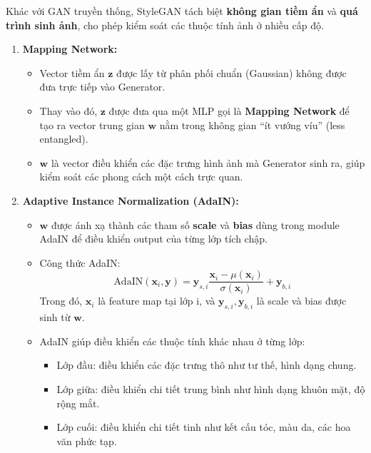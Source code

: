 Khác với GAN truyền thống, StyleGAN tách biệt \textbf{không gian tiềm ẩn} và \textbf{quá trình sinh ảnh}, cho phép kiểm soát các thuộc tính ảnh ở nhiều cấp độ.

\begin{enumerate}
	\item \textbf{Mapping Network:} 
	\begin{itemize}
		\item Vector tiềm ẩn $\mathbf{z}$ được lấy từ phân phối chuẩn (Gaussian) không được đưa trực tiếp vào Generator.
		\item Thay vào đó, $\mathbf{z}$ được đưa qua một MLP gọi là \textbf{Mapping Network} để tạo ra vector trung gian $\mathbf{w}$ nằm trong không gian “ít vướng víu” (less entangled). 
		\item $\mathbf{w}$ là vector điều khiển các đặc trưng hình ảnh mà Generator sinh ra, giúp kiểm soát các phong cách một cách trực quan.
	\end{itemize}
	
	\item \textbf{Adaptive Instance Normalization (AdaIN):} 
	\begin{itemize}
		\item $\mathbf{w}$ được ánh xạ thành các tham số \textbf{scale} và \textbf{bias} dùng trong module AdaIN để điều khiển output của từng lớp tích chập.
		\item Công thức AdaIN:
		\begin{equation}
			\text{AdaIN}(\mathbf{x}_i, \mathbf{y}) = \mathbf{y}_{s,i} \frac{\mathbf{x}_i - \mu(\mathbf{x}_i)}{\sigma(\mathbf{x}_i)} + \mathbf{y}_{b,i}
		\end{equation}
		Trong đó, $\mathbf{x}_i$ là feature map tại lớp i, và $\mathbf{y}_{s,i}, \mathbf{y}_{b,i}$ là scale và bias được sinh từ $\mathbf{w}$.
		\item AdaIN giúp điều khiển các thuộc tính khác nhau ở từng lớp: 
		\begin{itemize}
			\item Lớp đầu: điều khiển các đặc trưng thô như tư thế, hình dạng chung. 
			\item Lớp giữa: điều khiển chi tiết trung bình như hình dạng khuôn mặt, độ rộng mắt. 
			\item Lớp cuối: điều khiển chi tiết tinh như kết cấu tóc, màu da, các hoa văn phức tạp.
		\end{itemize}
	\end{itemize}
\end{enumerate}

